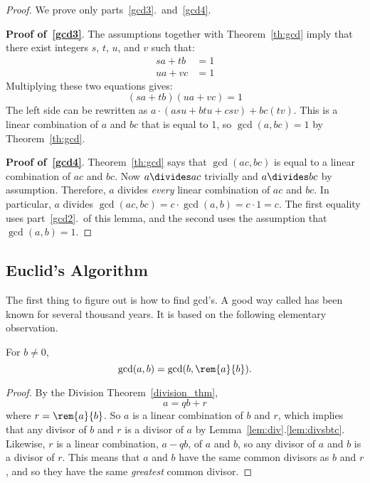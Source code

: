 \begin{editingnotes}
\begin{proof} We prove only parts~\ref{gcd3}.\ and~\ref{gcd4}.

\textbf{Proof of~\ref{gcd3}}.  The assumptions together with Theorem~\ref{th:gcd} imply
that there exist integers $s$, $t$, $u$, and $v$ such that:
\begin{align*}
s a + t b & = 1 \\
u a + v c & = 1
\end{align*}
Multiplying these two equations gives:
\[
(s a + t b)(u a + v c) = 1
\]
The left side can be rewritten as $a \cdot (a s u + b t u + c s v) + b c (t v)$.  This is a
linear combination of $a$ and $b c$ that is equal to 1, so $\gcd(a, bc) = 1$ by
Theorem~\ref{th:gcd}.

\textbf{Proof of~\ref{gcd4}}.  Theorem~\ref{th:gcd} says that $\gcd(ac, bc)$ is equal to
a linear combination of $ac$ and $bc$.  Now $a \divides ac$ trivially and $a \divides
bc$ by assumption.  Therefore, $a$ divides \emph{every} linear combination of $ac$ and
$bc$.  In particular, $a$ divides $\gcd(ac, bc) = c \cdot \gcd(a, b) = c\cdot 1 = c$.
The first equality uses part~\ref{gcd2}.\ of this lemma, and the second uses the
assumption that $\gcd(a, b) = 1$.
\end{proof}
\end{editingnotes}

\subsection{Euclid's Algorithm}
The first thing to figure out is how to find gcd's.  A good way called  has been known for several thousand years.  It is based on the following
elementary observation.

\begin{lemma}\label{lem:gcd}
For $b \neq 0$,
\[
\gcd(a, b) = \gcd(b, \rem{a}{b}).
\]

\begin{proof}
By the Division Theorem~\ref{division_thm},
\begin{equation}\label{aqbrprf}
a = qb + r
\end{equation}
where $r = \rem{a}{b}$.  So $a$ is a linear combination of $b$ and $r$, which implies that
any divisor of $b$ and $r$ is a divisor of $a$ by Lemma~\ref{lem:div}.\ref{lem:divsbtc}.
Likewise, $r$ is a linear combination, $a-qb$, of $a$ and $b$, so any divisor of $a$ and
$b$ is a divisor of $r$.  This means that $a$ and $b$ have the same common divisors as $b$
and $r$, and so they have the same \emph{greatest} common divisor.
\end{proof}
\end{lemma}

